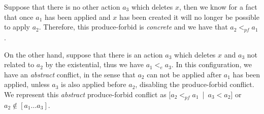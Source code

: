 \begin{description}[style=nextline,leftmargin=*]
    Suppose that there is no other action $a_3$ which deletes $x$, then we know for a fact that once $a_1$ has been applied and $x$ has been created it will no longer be possible to apply $a_2$. Therefore, this produce-forbid is \emph{concrete} and we have that $a_2 <_{pf} a_1$.

    On the other hand, suppose that there is an action $a_3$ which deletes $x$ and $a_3$ not related to $a_2$ by the existential, thus we have $a_1 <_e a_3$. In this configuration, we have an \emph{abstract} conflict, in the sense that $a_2$ can not be applied after $a_1$ has been applied, unless $a_3$ is also applied before $a_2$, disabling the produce-forbid conflict. We represent this \emph{abstract} produce-forbid conflict as \mbox{$[a_2 <_{pf} a_1$ | $a_3 < a_2]$} or \mbox{$a_2 \not\in [a_1\ldots a_3]$}.
\end{description}

